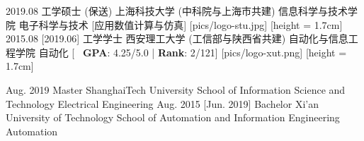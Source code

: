 \ifzh
    \begin{educations}[logo]
        \education
        {2019.08}
        {工学硕士 (保送)}
        {上海科技大学 (中科院与上海市共建)}
        {信息科学与技术学院}
        {电子科学与技术}
        [\textbullet 应用数值计算与仿真] %
        [pics/logo-stu.jpg]
        [height = 1.7cm]
        \separator{0.5ex}
        \education
        {2015.08}
        [2019.06]
        {工学学士}
        {西安理工大学 (工信部与陕西省共建)}
        {自动化与信息工程学院}
        {自动化}
        [\textbullet ~ \textbf{GPA}: 4.25/5.0 | \textbf{Rank}: 2/121]
        [pics/logo-xut.png]
        [height = 1.7cm]
    \end{educations}
\else
    \begin{educations}
        \education
        {Aug. 2019}
        {Master}
        {ShanghaiTech University}
        {School of Information Science and Technology}
        {Electrical Engineering}
        \separator{0.5ex}
        \education
        {Aug. 2015}
        [Jun. 2019]
        {Bachelor}
        {Xi'an University of Technology}
        {School of Automation and Information Engineering}
        {Automation}
    \end{educations}
\fi